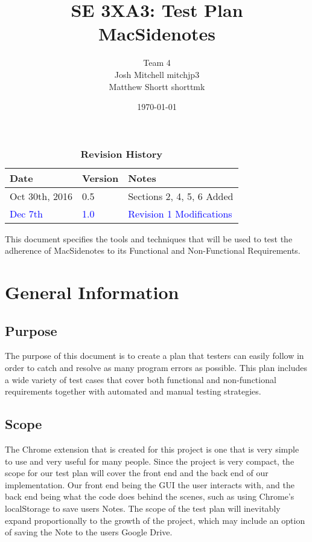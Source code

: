 \documentclass[12pt, titlepage]{article}
\title{SE 3XA3: Test Plan\\MacSidenotes}
\author{Team 4
		\\ Josh Mitchell mitchjp3
		\\ Matthew Shortt shorttmk
}
\date{\today}
\begin{document}
\maketitle

\tableofcontents
\listoftables
\listoffigures

\begin{table}[bp]
\caption{\bf Revision History}
\begin{tabularx}{\textwidth}{p{3cm}p{2cm}X}
\toprule {\bf Date} & {\bf Version} & {\bf Notes}\\
\midrule
Oct 30th, 2016 & 0.5 & Sections 2, 4, 5, 6 Added\\
\textcolor{blue}{Dec 7th} & \textcolor{blue}{1.0} & \textcolor{blue}{Revision 1 
Modifications}\\
\bottomrule
\end{tabularx}
\end{table}

\newpage


This document specifies the tools and techniques that will be used to test the 
adherence of MacSidenotes to its Functional and Non-Functional Requirements. 

\section{General Information}

\subsection{Purpose}

The purpose of this document is to create a plan that testers can easily follow in 
order to catch and resolve as many program errors as possible. This plan includes a wide 
variety of test cases that cover both functional and non-functional requirements together 
with automated and manual testing strategies. 

\subsection{Scope}

The Chrome extension that is created for this project is one that is very simple to use and 
very useful for many people.  Since the project is very compact, the scope for our test 
plan will cover the front end and the back end of our implementation. Our front end being 
the GUI the user interacts with, and the back end being what the code does behind the 
scenes, such as using Chrome's localStorage to save users Notes. The scope of the test 
plan will inevitably expand proportionally to the growth of the project, which may include 
an option of saving the Note to the users Google Drive.
\end{document}
